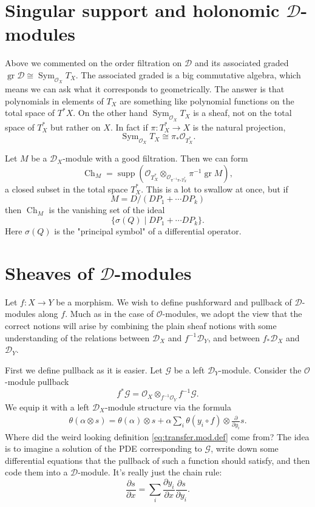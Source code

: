 \documentclass[12pt]{article}
\theoremstyle{plain}
\theoremstyle{definition}
\numberwithin{equation}{section}
\DeclareMathOperator{\Sym}{Sym}
\DeclareMathOperator{\supp}{supp}
\DeclareMathOperator{\ch}{Ch}
\DeclareMathOperator{\gr}{gr}
\newcommand{\al}{\alpha}
\newcommand{\CD}{\mathcal{D}}
\newcommand{\CG}{\mathcal{G}}
\newcommand{\OO}{\mathcal{O}}
\begin{document}
\section{Singular support and holonomic $\CD$-modules}


Above we commented on the order filtration on $\CD$ and its associated graded $\gr \CD \cong \Sym_{\OO_X} T_X$. The associated graded is a big commutative algebra, which means we can ask what it corresponds to geometrically. The answer is that polynomials in elements of $T_X$ are something like polynomial functions on the total space of $T^*X$. On the other hand $\Sym_{\OO_X} T_X$ is a sheaf, not on the total space of $T^*_X$ but rather on $X$. In fact if $\pi : T^*_X \rightarrow X$ is the natural projection, 
\[
\Sym_{\OO_X} T_X \cong \pi_* \OO_{T^*_X}.
\]

Let $M$ be a $\CD_X$-module with a good filtration. Then we can form
\[
\ch_M = \supp\left( \OO_{T^*_X} \otimes_{\OO_{\pi^{-1} \pi_* T^*_X}} \pi^{-1} \gr M \right),
\]
a closed subset in the total space $T^*_X$. This is a lot to swallow at once, but if
\[
M = D / (D P_1 + \cdots D P_k)
\]
then $\ch_M$ is the vanishing set of the ideal
\[
\{\sigma(Q) \mid D P_1 + \cdots D P_k\}.
\]
Here $\sigma(Q)$ is the "principal symbol" of a differential operator.






\section{Sheaves of $\CD$-modules}

Let $f : X \rightarrow Y$ be a morphism. We wish to define pushforward and pullback of $\CD$-modules along $f$. Much as in the case of $\OO$-modules, we adopt the view that the correct notions will arise by combining the plain sheaf notions with some understanding of the relations between $\CD_X$ and $f^{-1}\CD_Y$, and between $f_*\CD_X$ and $\CD_Y$.


First we define pullback as it is easier. Let $\CG$ be a left $\CD_Y$-module. Consider the $\OO$-module pullback
\[
f^*\CG = \OO_X \otimes_{f^{-1} \OO_Y} f^{-1} \CG.
\]
We equip it with a left $\CD_X$-module structure via the formula
\begin{align}\label{eq:transfer.mod.def}
\theta(\al \otimes s) = \theta(\al) \otimes s + \al \sum_i \theta(y_i \circ f) \otimes \frac{\partial}{\partial y_i} s.
\end{align}
Where did the weird looking definition \eqref{eq:transfer.mod.def} come from? The idea is to imagine a solution of the PDE corresponding to $\CG$, write down some differential equations that the pullback of such a function should satisfy, and then code them into a $\CD$-module. It's really just the chain rule:
\[
\frac{\partial s}{\partial x} = \sum_i \frac{\partial y_i}{\partial x} \frac{\partial s}{\partial y_i}.
\]
\end{document}

